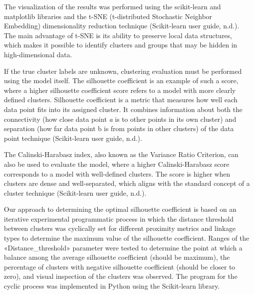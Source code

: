 \begin{multicols}{2}
The visualization of the results was performed using the scikit-learn
and matplotlib libraries and the t-SNE (t-distributed Stochastic
Neighbor Embedding) dimensionality reduction technique (Scikit-learn
user guide, n.d.). The main advantage of t-SNE is its ability to
preserve local data structures, which makes it possible to identify
clusters and groups that may be hidden in high-dimensional data.

If the true cluster labels are unknown, clustering evaluation must be
performed using the model itself. The silhouette coefficient is an
example of such a score, where a higher silhouette coefficient score
refers to a model with more clearly defined clusters. Silhouette
coefficient is a metric that measures how well each data point fits into
its assigned cluster. It combines information about both the
connectivity (how close data point \emph{a} is to other points in its
own cluster) and separation (how far data point b is from points in
other clusters) of the data point technique (Scikit-learn user guide,
n.d.).

The Calinski-Harabasz index, also known as the Variance Ratio Criterion,
can also be used to evaluate the model, where a higher Calinski-Harabasz
score corresponds to a model with well-defined clusters. The score is
higher when clusters are dense and well-separated, which aligns with the
standard concept of a cluster technique (Scikit-learn user guide, n.d.).

Our approach to determining the optimal silhouette coefficient is based
on an iterative experimental programmatic process in which the distance
threshold between clusters was cyclically set for different proximity
metrics and linkage types to determine the maximum value of the
silhouette coefficient. Ranges of the «Distance\_threshold» parameter
were tested to determine the point at which a balance among the average
silhouette coefficient (should be maximum), the percentage of clusters
with negative silhouette coefficient (should be closer to zero), and
visual inspection of the clusters was observed. The program for the
cyclic process was implemented in Python using the Scikit-learn library.
\end{multicols}

